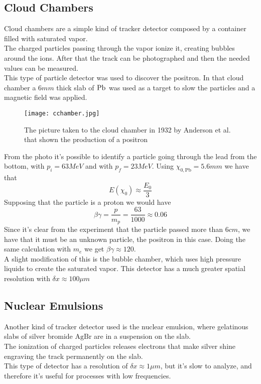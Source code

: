 \documentclass[../qm.tex]{subfiles}
\begin{document}
\subsection{Cloud Chambers}
Cloud chambers are a simple kind of tracker detector composed by a container filled with saturated vapor.\\
The charged particles passing through the vapor ionize it, creating bubbles around the ions. After that the track can be photographed and then the needed values can be measured.\\
This type of particle detector was used to discover the positron. In that cloud chamber a $6\unit{mm}$ thick slab of ${}_{}^{}{\mathrm{Pb}}_{}$ was used as a target to slow the particles and a magnetic field was applied.\\
\begin{figure}[H]
	\centering
	\texttt{[image: cchamber.jpg]}
	\caption{The picture taken to the cloud chamber in 1932 by Anderson et al. that shown the production of a positron}
	\label{fig:positrondisc}
\end{figure}
From the photo it's possible to identify a particle going through the lead from the bottom, with $p_i=63\unit{MeV}$ and with $p_f=23\unit{MeV}$. Using $\chi_{0,\mathrm{Pb}}=5.6\unit{mm}$ we have that
\begin{equation*}
	E(\chi_0)\approx\frac{E_0}{3}
\end{equation*}
Supposing that the particle is a proton we would have
\begin{equation*}
	\beta\gamma=\frac{p}{m_p}=\frac{63}{1000}\approx0.06
\end{equation*}
Since it's clear from the experiment that the particle passed more than $6\unit{cm}$, we have that it must be an unknown particle, the positron in this case. Doing the same calculation with $m_e$ we get $\beta\gamma\approx120$.\\
A slight modification of this is the bubble chamber, which uses high pressure liquids to create the saturated vapor. This detector has a much greater spatial resolution with $\delta x\approx100\unit{\mu m}$
\subsection{Nuclear Emulsions}
Another kind of tracker detector used is the nuclear emulsion, where gelatinous slabs of silver bromide $\mathrm{AgBr}$ are in a suspension on the slab.\\
The ionization of charged particles releases electrons that make silver shine engraving the track permanently on the slab.\\
This type of detector has a resolution of $\delta x\approx1\unit{\mu m}$, but it's slow to analyze, and therefore it's useful for processes with low frequencies.
\end{document}

